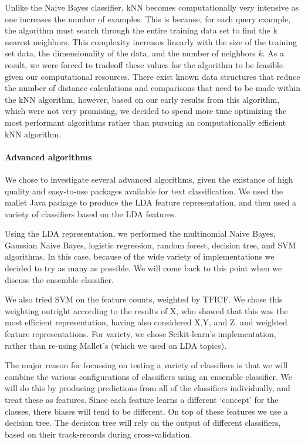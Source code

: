 \documentclass[conference,letterpaper]{IEEEtran}
\begin{document}
Unlike the Naive Bayes classifier, kNN becomes computationally very intensive
as one increases the number of examples.  This is because, for each query
example, the algorithm must search through the entire training data set to
find the k nearest neighbors.  This complexity increases linearly with the
size of the training set data, the dimensionality of the data, and the 
number of neighbors $k$.  As a result, we were forced to tradeoff these values
for the algorithm to be feasible given our computational resources.  There
exist known data structures that reduce the number of distance calculations and
comparisons that need to be made within the kNN algorithm, however, based on
our early results from this algorithm, which were not very promising, we 
decided to spend more time optimizing the most performant algorithms rather
than pursuing an computationally efficient kNN algorithm.


\paragraph{Advanced algorithms}
We chose to investigate several advanced algorithms, given the existance of
high quality and easy-to-use packages available for text classification.
We used the mallet Java package to produce the LDA feature representation, 
and then used a variety of classifiers based on the LDA features.

Using the LDA representation, we performed the multinomial Naive 
Bayes, Gaussian Naive Bayes, logistic regression, random forest, decision tree,
and SVM algorithms.  In this case, because of the wide variety of 
implementations we decided to try as many as possible.  We will come back to
this point when we discuss the ensemble classifier.  

We also tried SVM on the feature counts, weighted by TFICF.  We chose this 
weighting outright according to the results of X, who showed that this was
the most efficient representation, having also considered X,Y, and Z.  and 
weighted feature representations.  For variety, we chose Scikit-learn's 
implementation, rather than re-using Mallet's (which we used on LDA topics).

The major reason for focussing on testing a variety of classifiers is that
we will combine the various configurations of classifiers using an ensemble
classifier.  We will do this by producing predictions from all of the 
classifiers individually, and treat these as features.  Since each 
feature learns a different `concept' for the classes, there biases will
tend to be different.  On top of these features we use a decision tree.
The decision tree will rely on the output of different classifiers, based 
on their track-records during cross-validation.
\end{document}
